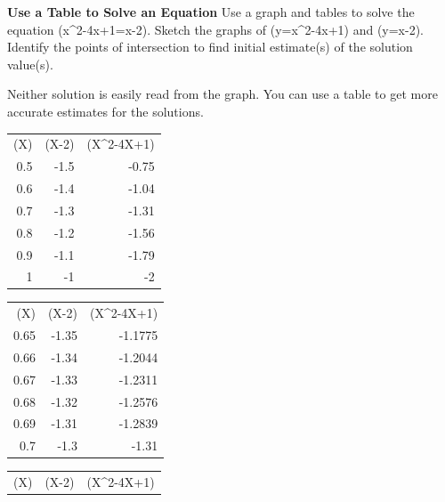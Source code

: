 \documentclass{article}
\newenvironment{example}[1]{}{}         %
\newcommand{\placeholder}[2]{}          %
\newcommand{\te}[1]{}                   %
\begin{document}
\begin{example}{3}
\textbf{Use a Table to Solve an Equation}
Use a graph and tables to solve the equation (x^2-4x+1=x-2).
Sketch the graphs of (y=x^2-4x+1) and (y=x-2). Identify the points of intersection to find initial estimate(s) of the solution value(s).
\placeholder{graph}{Red upward parabola labeled y=x^2-4x+1 has vertex (2,-3), y-intercept (0,1); blue ascending line labeled y=x-2 has intercepts (0,-2),(2,0). Curves intersect between x=0 and 1 and between x=4 and 5, no point markers. Arrowheads at all visible curve ends. Axes x,y arrowed; unit grid; x labels -2,O,2,4,6 and y labels -4,-2,2. Window [-3,7] by [-5,5].}
\te{Callouts: One solution lies between 4 and 5. One solution lies between 0 and 1.}
Neither solution is easily read from the graph. You can use a table to get more accurate estimates for the solutions.
\begin{tabular}{rrr}
(X) & (X-2) & (X^2-4X+1) \\
0.5 & -1.5 & -0.75 \\
0.6 & -1.4 & -1.04 \\
0.7 & -1.3 & -1.31 \\
0.8 & -1.2 & -1.56 \\
0.9 & -1.1 & -1.79 \\
1 & -1 & -2 \\
\end{tabular}
\te{Rows 0.6 and 0.7 are red. Callout: The solution lies between 0.6 and 0.7. So lets check the hundredths place. USE APPROPRIATE TOOLS Create tables using a calculator or spreadsheet. When you let technology perform the calculations, you can concentrate on what the numbers mean.}
\begin{tabular}{rrr}
(X) & (X-2) & (X^2-4X+1) \\
0.65 & -1.35 & -1.1775 \\
0.66 & -1.34 & -1.2044 \\
0.67 & -1.33 & -1.2311 \\
0.68 & -1.32 & -1.2576 \\
0.69 & -1.31 & -1.2839 \\
0.7 & -1.3 & -1.31 \\
\end{tabular}
\te{Rows 0.69 and 0.7 are red. Callout: Look for values where graphs will cross. Use these values to find better approximations.}
\begin{tabular}{rrr}
(X) & (X-2) & (X^2-4X+1) \\

\end{tabular}
\end{example}
\end{document}
